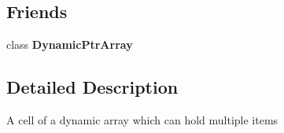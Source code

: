 \subsection*{Friends}
\begin{DoxyCompactItemize}
\item 
\hypertarget{class_dynamic_ptr_array_cell_a75e94b2802801e4f9cb2d5c6a21e25df}{class {\bfseries Dynamic\+Ptr\+Array}}\label{class_dynamic_ptr_array_cell_a75e94b2802801e4f9cb2d5c6a21e25df}

\end{DoxyCompactItemize}


\subsection{Detailed Description}
A cell of a dynamic array which can hold multiple items 

